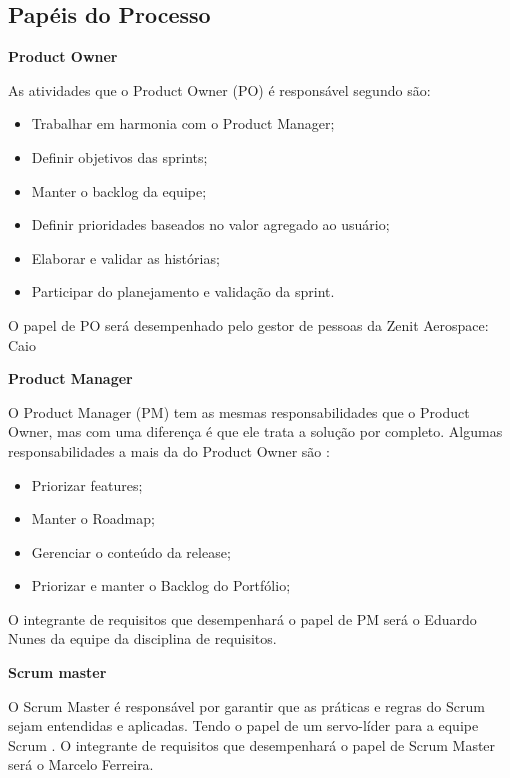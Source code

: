 \subsection{Papéis do Processo}\label{processoPapeis}
\begin{description}
\item \textbf{Product Owner}

As atividades que o Product Owner (PO) é responsável segundo \cite{leffingwell2011} são:
\begin{itemize}
    \item Trabalhar em harmonia com o Product Manager;
    \item Definir objetivos das sprints;
    \item Manter o backlog da equipe;
    \item Definir prioridades baseados no valor agregado ao usuário;
    \item Elaborar e validar as histórias;
    \item Participar do planejamento e validação da sprint.
\end{itemize}
O papel de PO será desempenhado pelo gestor de pessoas da Zenit Aerospace: Caio

\item \textbf{Product Manager}

O Product Manager (PM) tem as mesmas responsabilidades que o Product Owner, mas com uma diferença é que ele trata a solução por completo. Algumas responsabilidades a mais da do Product Owner são \cite{leffingwell2011}:
\begin{itemize}
    \item Priorizar features;
    \item Manter o Roadmap;
    \item Gerenciar o conteúdo da release;
    \item Priorizar e manter o Backlog do Portfólio;
\end{itemize}

O integrante de requisitos que desempenhará o papel de PM será o Eduardo Nunes da equipe da disciplina de requisitos.

\item \textbf{Scrum master}

O Scrum Master é responsável por garantir que as práticas e regras do Scrum sejam entendidas e aplicadas. Tendo o papel de um servo-líder para a equipe Scrum \cite{agileManifest}. O integrante de requisitos que desempenhará o papel de Scrum Master será o Marcelo Ferreira.


\end{description}
